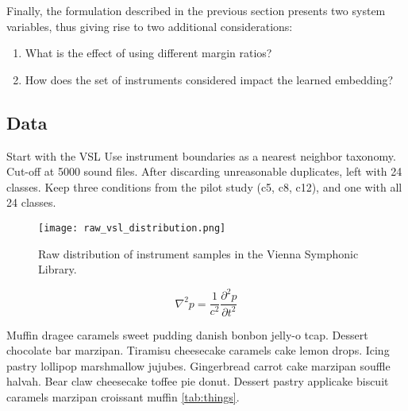 Finally, the formulation described in the previous section presents two system variables, thus giving rise to two additional considerations:

\begin{enumerate}
\item What is the effect of using different margin ratios?
\item How does the set of instruments considered impact the learned embedding?
\end{enumerate}


\subsection{Data}
Start with the VSL
Use instrument boundaries as a nearest neighbor taxonomy.
Cut-off at 5000 sound files.
After discarding unreasonable duplicates, left with 24 classes.
Keep three conditions from the pilot study (c5, c8, c12), and one with all 24 classes.

\begin{figure}[h]
\centering
\texttt{[image: raw\_vsl\_distribution.png]}
\caption{Raw distribution of instrument samples in the Vienna Symphonic Library.}
\label{fig:muffin}
\end{figure}


\begin{equation}
\nabla^2p = \frac{1}{c^2} \frac{\partial^2 p}{\partial t^2}
\label{eq:wave}
\end{equation}

Muffin dragee caramels sweet pudding danish bonbon jelly-o \gls{tcap}.
Dessert chocolate bar marzipan.
Tiramisu cheesecake caramels cake lemon drops. Icing pastry lollipop marshmallow jujubes.
Gingerbread carrot cake marzipan souffle halvah. Bear claw cheesecake toffee pie donut.
Dessert pastry applicake biscuit caramels marzipan croissant muffin \ref{tab:things}.

